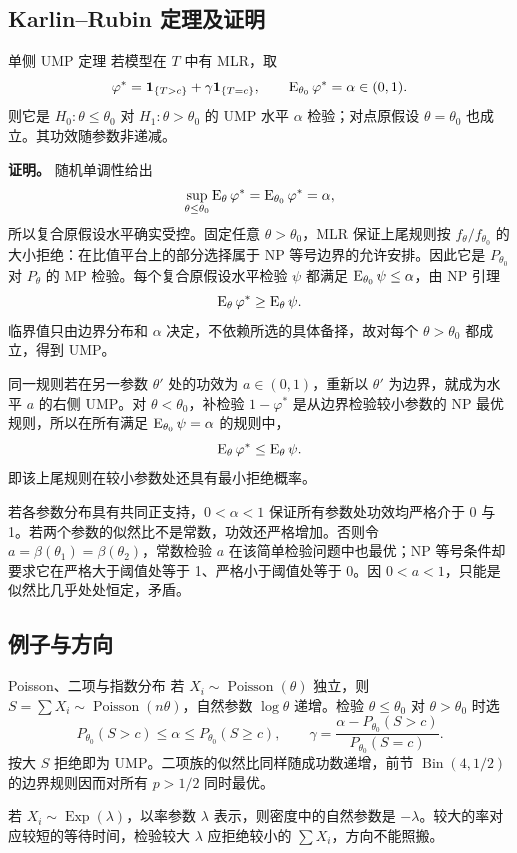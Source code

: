 \subsection{Karlin--Rubin 定理及证明}

\begin{definitionbox}{单侧 UMP 定理}
若模型在 $T$ 中有 MLR，取
\[
 \varphi^*=\mathbf 1_{\{T>c\}}+\gamma\mathbf 1_{\{T=c\}},
 \qquad \operatorname{E}_{\theta_0}\varphi^*=\alpha\in(0,1).
\]
则它是 $H_0:\theta\le\theta_0$ 对 $H_1:\theta>\theta_0$ 的 UMP 水平 $\alpha$ 检验；对点原假设 $\theta=\theta_0$ 也成立。其功效随参数非递减。
\end{definitionbox}

\textbf{证明。}
随机单调性给出
\[
 \sup_{\theta\le\theta_0}\operatorname{E}_\theta\varphi^*
 =\operatorname{E}_{\theta_0}\varphi^*=\alpha,
\]
所以复合原假设水平确实受控。固定任意 $\theta>\theta_0$，MLR 保证上尾规则按 $f_\theta/f_{\theta_0}$ 的大小拒绝：在比值平台上的部分选择属于 NP 等号边界的允许安排。因此它是 $P_{\theta_0}$ 对 $P_\theta$ 的 MP 检验。每个复合原假设水平检验 $\psi$ 都满足 $\operatorname{E}_{\theta_0}\psi\le\alpha$，由 NP 引理
\[
 \operatorname{E}_\theta\varphi^*\ge\operatorname{E}_\theta\psi.
\]
临界值只由边界分布和 $\alpha$ 决定，不依赖所选的具体备择，故对每个 $\theta>\theta_0$ 都成立，得到 UMP。

同一规则若在另一参数 $\theta'$ 处的功效为 $a\in(0,1)$，重新以 $\theta'$ 为边界，就成为水平 $a$ 的右侧 UMP。对 $\theta<\theta_0$，补检验 $1-\varphi^*$ 是从边界检验较小参数的 NP 最优规则，所以在所有满足 $\operatorname{E}_{\theta_0}\psi=\alpha$ 的规则中，
\[
 \operatorname{E}_\theta\varphi^*\le\operatorname{E}_\theta\psi.
\]
即该上尾规则在较小参数处还具有最小拒绝概率。

若各参数分布具有共同正支持，$0<\alpha<1$ 保证所有参数处功效均严格介于 0 与 1。若两个参数的似然比不是常数，功效还严格增加。否则令 $a=\beta(\theta_1)=\beta(\theta_2)$，常数检验 $a$ 在该简单检验问题中也最优；NP 等号条件却要求它在严格大于阈值处等于 1、严格小于阈值处等于 0。因 $0<a<1$，只能是似然比几乎处处恒定，矛盾。

\subsection{例子与方向}

\begin{examplebox}{Poisson、二项与指数分布}
若 $X_i\sim\operatorname{Poisson}(\theta)$ 独立，则 $S=\sum X_i\sim\operatorname{Poisson}(n\theta)$，自然参数 $\log\theta$ 递增。检验 $\theta\le\theta_0$ 对 $\theta>\theta_0$ 时选
\[
 P_{\theta_0}(S>c)\le\alpha\le P_{\theta_0}(S\ge c),\qquad
 \gamma=\frac{\alpha-P_{\theta_0}(S>c)}{P_{\theta_0}(S=c)}.
\]
按大 $S$ 拒绝即为 UMP。二项族的似然比同样随成功数递增，前节 $\operatorname{Bin}(4,1/2)$ 的边界规则因而对所有 $p>1/2$ 同时最优。

若 $X_i\sim\operatorname{Exp}(\lambda)$，以率参数 $\lambda$ 表示，则密度中的自然参数是 $-\lambda$。较大的率对应较短的等待时间，检验较大 $\lambda$ 应拒绝较小的 $\sum X_i$，方向不能照搬。
\end{examplebox}

